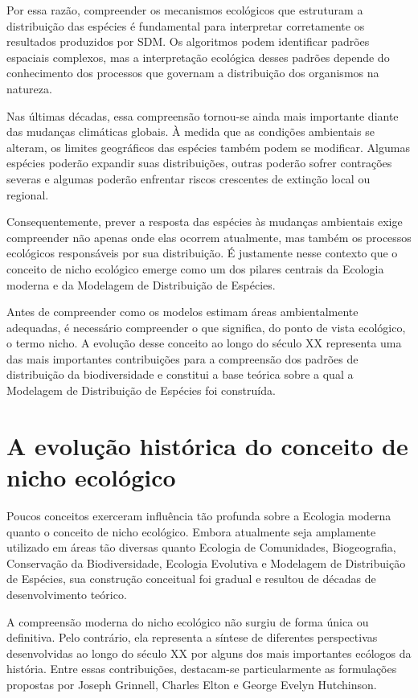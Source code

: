 Por essa razão, compreender os mecanismos ecológicos que estruturam a distribuição das espécies é fundamental para interpretar corretamente os resultados produzidos por SDM. Os algoritmos podem identificar padrões espaciais complexos, mas a interpretação ecológica desses padrões depende do conhecimento dos processos que governam a distribuição dos organismos na natureza.

Nas últimas décadas, essa compreensão tornou-se ainda mais importante diante das mudanças climáticas globais. À medida que as condições ambientais se alteram, os limites geográficos das espécies também podem se modificar. Algumas espécies poderão expandir suas distribuições, outras poderão sofrer contrações severas e algumas poderão enfrentar riscos crescentes de extinção local ou regional.

Consequentemente, prever a resposta das espécies às mudanças ambientais exige compreender não apenas onde elas ocorrem atualmente, mas também os processos ecológicos responsáveis por sua distribuição. É justamente nesse contexto que o conceito de nicho ecológico emerge como um dos pilares centrais da Ecologia moderna e da Modelagem de Distribuição de Espécies.

Antes de compreender como os modelos estimam áreas ambientalmente adequadas, é necessário compreender o que significa, do ponto de vista ecológico, o termo nicho. A evolução desse conceito ao longo do século XX representa uma das mais importantes contribuições para a compreensão dos padrões de distribuição da biodiversidade e constitui a base teórica sobre a qual a Modelagem de Distribuição de Espécies foi construída.

\section{A evolução histórica do conceito de nicho ecológico}

Poucos conceitos exerceram influência tão profunda sobre a Ecologia moderna quanto o conceito de nicho ecológico. Embora atualmente seja amplamente utilizado em áreas tão diversas quanto Ecologia de Comunidades, Biogeografia, Conservação da Biodiversidade, Ecologia Evolutiva e Modelagem de Distribuição de Espécies, sua construção conceitual foi gradual e resultou de décadas de desenvolvimento teórico.

A compreensão moderna do nicho ecológico não surgiu de forma única ou definitiva. Pelo contrário, ela representa a síntese de diferentes perspectivas desenvolvidas ao longo do século XX por alguns dos mais importantes ecólogos da história. Entre essas contribuições, destacam-se particularmente as formulações propostas por Joseph Grinnell, Charles Elton e George Evelyn Hutchinson.

